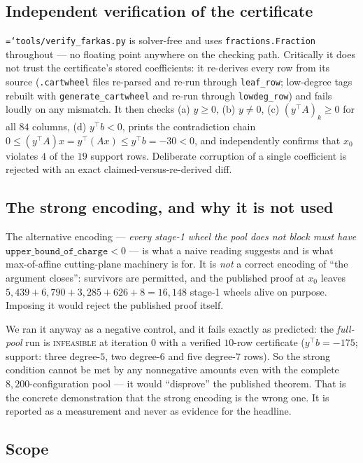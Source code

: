 \documentclass[11pt]{article}
\theoremstyle{definition}
\newcommand{\art}[1]{{\texttt{\hyphenchar\font=`\-\relax #1}}}
\begin{document}
\subsection{Independent verification of the certificate}

\art{tools/verify\_farkas.py} is solver-free and uses \texttt{fractions.Fraction}
throughout --- no floating point anywhere on the checking path. Critically it does
not trust the certificate's stored coefficients: it re-derives every row from its
source (\texttt{.cartwheel} files re-parsed and re-run through \texttt{leaf\_row};
low-degree tags rebuilt with \texttt{generate\_cartwheel} and re-run through
\texttt{lowdeg\_row}) and fails loudly on any mismatch. It then checks
(a) $y\ge 0$, (b) $y\ne 0$, (c) $(y^\top A)_k \ge 0$ for all $84$ columns,
(d) $y^\top b < 0$, prints the contradiction chain
$0 \le (y^\top A)x = y^\top(Ax) \le y^\top b = -30 < 0$, and independently confirms
that $x_0$ violates $4$ of the $19$ support rows. Deliberate corruption of a single
coefficient is rejected with an exact claimed-versus-re-derived diff.

\subsection{The strong encoding, and why it is not used}
\label{sec:strongenc}

The alternative encoding --- \emph{every stage-1 wheel the pool does not block must
have $\texttt{upper\_bound\_of\_charge} < 0$} --- is what a naive reading suggests and
is what max-of-affine cutting-plane machinery is for. It is \emph{not} a correct
encoding of ``the argument closes'': survivors are permitted, and the published proof
at $x_0$ leaves $5{,}439 + 6{,}790 + 3{,}285 + 626 + 8 = 16{,}148$ stage-1 wheels
alive on purpose. Imposing it would reject the published proof itself.

We ran it anyway as a negative control, and it fails exactly as predicted: the
\emph{full-pool} run is \textsc{infeasible} at iteration $0$ with a verified $10$-row
certificate ($y^\top b = -175$; support: three degree-$5$, two degree-$6$ and five
degree-$7$ rows). So the strong condition cannot be met by any nonnegative amounts
even with the complete $8{,}200$-configuration pool --- it would ``disprove'' the
published theorem. That is the concrete demonstration that the strong encoding is the
wrong one. It is reported as a measurement and never as evidence for the headline.

\subsection{Scope}
\label{sec:lp-scope}
\end{document}
